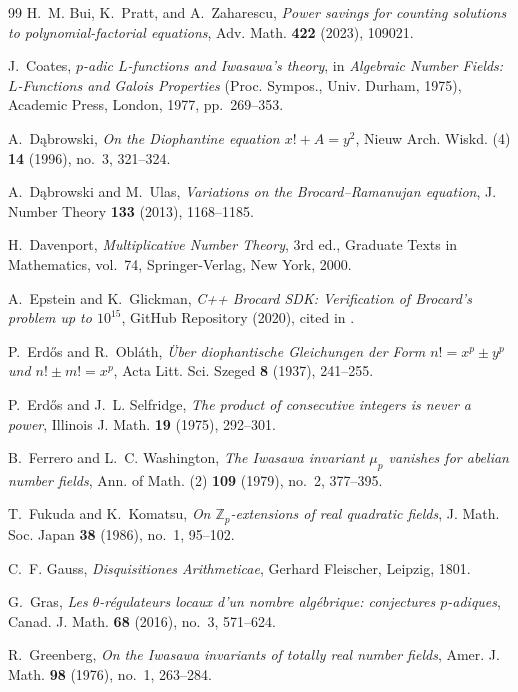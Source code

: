 \documentclass[11pt,reqno]{amsart}
\theoremstyle{remark}
\numberwithin{equation}{section}
\newcommand{\Z}{\mathbb{Z}}
\begin{document}
\begin{thebibliography}{99}
H.~M. Bui, K.~Pratt, and A.~Zaharescu, \emph{Power savings for counting solutions to polynomial-factorial equations}, Adv. Math. \textbf{422} (2023), 109021.

J.~Coates, \emph{$p$-adic $L$-functions and Iwasawa's theory}, in \emph{Algebraic Number Fields: $L$-Functions and Galois Properties} (Proc. Sympos., Univ. Durham, 1975), Academic Press, London, 1977, pp.~269--353.

A.~D\k{a}browski, \emph{On the Diophantine equation $x! + A = y^2$}, Nieuw Arch. Wiskd. (4) \textbf{14} (1996), no.~3, 321--324.

A.~D\k{a}browski and M.~Ulas, \emph{Variations on the Brocard--Ramanujan equation}, J. Number Theory \textbf{133} (2013), 1168--1185.

H.~Davenport, \emph{Multiplicative Number Theory}, 3rd ed., Graduate Texts in Mathematics, vol.~74, Springer-Verlag, New York, 2000.

A.~Epstein and K.~Glickman, \emph{C++ Brocard SDK: Verification of Brocard's problem up to $10^{15}$}, GitHub Repository (2020), cited in \cite{BuiPrattZaharescu2023}.

P.~Erd\H{o}s and R.~Obl\'ath, \emph{\"Uber diophantische Gleichungen der Form $n! = x^p \pm y^p$ und $n! \pm m! = x^p$}, Acta Litt. Sci. Szeged \textbf{8} (1937), 241--255.

P.~Erd\H{o}s and J.~L. Selfridge, \emph{The product of consecutive integers is never a power}, Illinois J. Math. \textbf{19} (1975), 292--301.

B.~Ferrero and L.~C. Washington, \emph{The Iwasawa invariant $\mu_p$ vanishes for abelian number fields}, Ann. of Math. (2) \textbf{109} (1979), no.~2, 377--395.

T.~Fukuda and K.~Komatsu, \emph{On $\Z_p$-extensions of real quadratic fields}, J. Math. Soc. Japan \textbf{38} (1986), no.~1, 95--102.

C.~F. Gauss, \emph{Disquisitiones Arithmeticae}, Gerhard Fleischer, Leipzig, 1801.

G.~Gras, \emph{Les $\theta$-r\'egulateurs locaux d'un nombre alg\'ebrique: conjectures $p$-adiques}, Canad. J. Math. \textbf{68} (2016), no.~3, 571--624.

R.~Greenberg, \emph{On the Iwasawa invariants of totally real number fields}, Amer. J. Math. \textbf{98} (1976), no.~1, 263--284.


\end{thebibliography}
\end{document}
